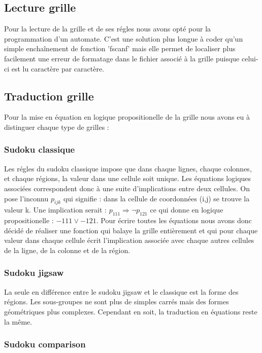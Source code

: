 \documentclass[a4paper,8pt,french,fleqn]{article}
\begin{document}
\subsection{Lecture grille}

Pour la lecture de la grille et de ses régles nous avons opté pour la programmation d'un automate. C'est une solution plus longue à coder qu'un simple enchaînement de fonction 'fscanf' mais elle permet de localiser plus facilement une erreur de formatage dans le fichier associé à la grille puisque celui-ci est lu caractère par caractère.

\subsection{Traduction grille}

Pour la mise en équation en logique propositionelle de la grille nous avons eu à distinguer chaque type de grilles : \\

\subsubsection*{Sudoku classique}

Les régles du sudoku classique impose que dans chaque lignes, chaque colonnes, et chaque régions, la valeur dans une cellule soit unique. Les équations logiques associées correspondent donc à une suite d'implications entre deux cellules. On pose l'inconnu $p_{ijk}$ qui signifie : dans la cellule de coordonnées (i,j) se trouve la valeur k. Une implication serait : $p_{111} \Rightarrow \neg p_{121}$ ce qui donne en logique propositionelle : $-111 \lor -121$. Pour écrire toutes les équations nous avons donc décidé de réaliser une fonction qui balaye la grille entièrement et qui pour chaque valeur dans chaque cellule écrit l'implication associée avec chaque autres cellules de la ligne, de la colonne et de la région.

\subsubsection*{Sudoku jigsaw}

La seule en différence entre le sudoku jigsaw et le classique est la forme des régions. Les sous-groupes ne sont plus de simples carrés mais des formes géométriques plus complexes. Cependant en soit, la traduction en équations reste la même.

\subsubsection*{Sudoku comparison}
\end{document}
